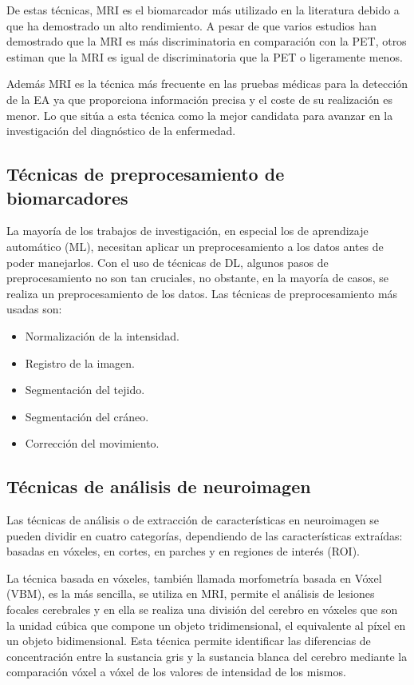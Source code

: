 De estas técnicas, MRI es el biomarcador más utilizado en la literatura debido a que ha demostrado un alto rendimiento.
A pesar de que varios estudios han demostrado que la MRI es más discriminatoria en comparación con la PET, otros estiman
que la MRI es igual de discriminatoria que la PET o ligeramente menos.

Además MRI es la técnica más frecuente en las pruebas médicas para la detección de la EA ya que proporciona información
precisa y el coste de su realización es menor.
Lo que sitúa a esta técnica como la mejor candidata para avanzar en la investigación del diagnóstico de la enfermedad.

\subsection{Técnicas de preprocesamiento de biomarcadores}\label{subsec:preprocesamiento-estado-del-arte}
La mayoría de los trabajos de investigación, en especial los de aprendizaje automático (ML), necesitan aplicar un
preprocesamiento a los datos antes de poder manejarlos.
Con el uso de técnicas de DL, algunos pasos de preprocesamiento no son tan cruciales, no obstante, en la mayoría de
casos, se realiza un preprocesamiento de los datos.
Las técnicas de preprocesamiento más usadas son:
\begin{itemize}
    \item Normalización de la intensidad.
    \item Registro de la imagen.
    \item Segmentación del tejido.
    \item Segmentación del cráneo.
    \item Corrección del movimiento.\\
\end{itemize}

\subsection{Técnicas de análisis de neuroimagen}\label{subsec:analisis-de neuroimagen-estado-del-arte}
Las técnicas de análisis o de extracción de características en neuroimagen se pueden dividir en cuatro categorías,
dependiendo de las características extraídas: basadas en vóxeles, en cortes, en parches y en regiones de interés (ROI).

La técnica basada en vóxeles, también llamada morfometría basada en Vóxel (VBM), es la más sencilla, se utiliza en MRI,
permite el análisis de lesiones focales cerebrales y en ella se realiza una división del cerebro en vóxeles que son la
unidad cúbica que compone un objeto tridimensional, el equivalente al píxel en un objeto bidimensional.
Esta técnica permite identificar las diferencias de concentración entre la sustancia gris y la sustancia blanca del
cerebro mediante la comparación vóxel a vóxel de los valores de intensidad de los mismos.

